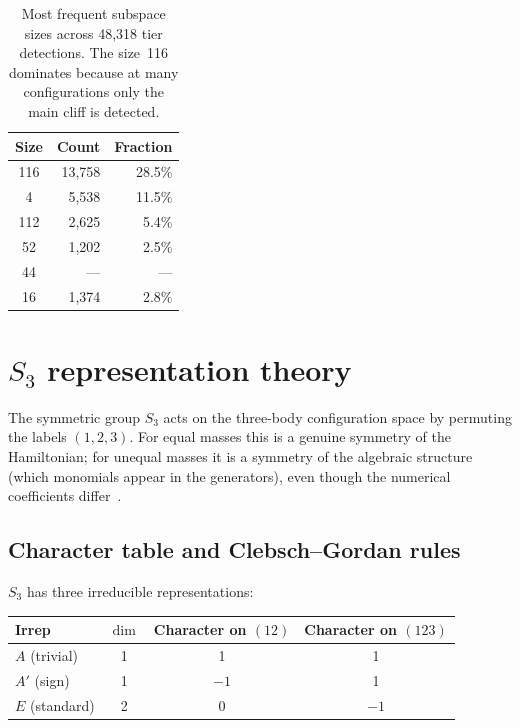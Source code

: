 \documentclass[11pt,a4paper]{article}
\theoremstyle{remark}
\newcommand{\SG}{S_3}
\begin{document}
\begin{table}[ht]
\centering
\begin{tabular}{@{}crr@{}}
\toprule
Size & Count & Fraction \\
\midrule
116 & 13{,}758 & 28.5\% \\
4   & 5{,}538  & 11.5\% \\
112 & 2{,}625  & 5.4\% \\
52  & 1{,}202  & 2.5\% \\
44  & --- & --- \\
16  & 1{,}374  & 2.8\% \\
\bottomrule
\end{tabular}
\caption{Most frequent subspace sizes across 48{,}318
  tier detections.  The size~116 dominates because at many
  configurations only the main cliff is detected.}
\label{tab:sizes}
\end{table}


\section{$S_3$ representation theory}
\label{sec:s3}

The symmetric group $\SG$ acts on the three-body
configuration space by permuting the labels
$(1,2,3)$.  For equal masses this is a genuine symmetry
of the Hamiltonian; for unequal masses it is a symmetry
of the algebraic structure (which monomials appear in the
generators), even though the numerical coefficients
differ~\cite{paper1}.

\subsection{Character table and Clebsch--Gordan rules}

$\SG$ has three irreducible representations:
\begin{center}
\begin{tabular}{@{}lccc@{}}
\toprule
Irrep & $\dim$ & Character on $(12)$ & Character on $(123)$ \\
\midrule
$A$ (trivial) & 1 & 1 & 1 \\
$A'$ (sign) & 1 & $-1$ & 1 \\
$E$ (standard) & 2 & 0 & $-1$ \\
\bottomrule
\end{tabular}
\end{center}
\end{document}
